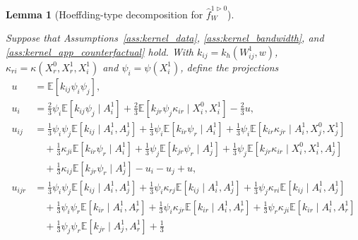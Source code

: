 \documentclass[11pt,lof]{puthesis}
\newcommand{\E}{\ensuremath{\mathbb{E}}}
\theoremstyle{break}
\newtheorem{lemma}{Lemma}[section]
\theoremstyle{proof}
\begin{document}
\begin{lemma}[Hoeffding-type decomposition for
  $\hat f_W^{1 \triangleright 0}$]
  \label{lem:kernel_app_counterfactual_hoeffding}

  Suppose that Assumptions~\ref{ass:kernel_data},
  \ref{ass:kernel_bandwidth}, and
  \ref{ass:kernel_app_counterfactual} hold.
  With $k_{i j} = k_h(W_{i j}^1, w)$,
  $\kappa_{r i} = \kappa(X_r^0, X_r^1, X_i^1)$
  and $\psi_i = \psi(X_i^1)$, define the projections
  \begin{align*}
    u
    &=
    \E\left[
      k_{i j}
      \psi_i
      \psi_j
    \right], \\
    u_i
    &=
    \frac{2}{3} \psi_i
    \E\left[
      k_{i j}
      \psi_j
    \mid A_i^1 \right]
    +
    \frac{2}{3} \E\left[
      k_{jr}
      \psi_j \kappa_{i r}
    \mid X_i^0, X_i^1 \right]
    - \frac{2}{3} u, \\
    u_{i j}
    &=
    \frac{1}{3}
    \psi_i
    \psi_j
    \E\left[
      k_{i j}
    \mid A_i^1, A_j^1 \right]
    +
    \frac{1}{3}
    \psi_i
    \E\left[
      k_{i r} \psi_r
    \mid A_i^1 \right]
    +
    \frac{1}{3}
    \psi_i
    \E\left[
      k_{i r} \kappa_{jr}
    \mid A_i^1, X_j^0, X_j^1 \right] \\
    &\quad+
    \frac{1}{3}
    \kappa_{j i}
    \E\left[
      k_{i r} \psi_r
    \mid A_i^1 \right]
    + \frac{1}{3}
    \psi_j
    \E\left[
      k_{jr} \psi_r
    \mid A_j^1 \right]
    +
    \frac{1}{3}
    \psi_j
    \E\left[
      k_{jr} \kappa_{i r}
    \mid X_i^0, X_i^1, A_j^1 \right] \\
    &\quad+
    \frac{1}{3}
    \kappa_{i j}
    \E\left[
      k_{jr} \psi_r
    \mid A_j^1 \right]
    - u_i - u_j + u, \\
    u_{i j r}
    &=
    \frac{1}{3}
    \psi_i \psi_j
    \E\left[
      k_{i j}
    \mid A_i^1, A_j^1 \right]
    +
    \frac{1}{3}
    \psi_i \kappa_{r j}
    \E\left[
      k_{i j}
    \mid A_i^1, A_j^1 \right]
    +
    \frac{1}{3}
    \psi_j \kappa_{r i}
    \E\left[
      k_{i j}
    \mid A_i^1, A_j^1 \right] \\
    &\quad+
    \frac{1}{3}
    \psi_i \psi_r
    \E\left[
      k_{i r}
    \mid A_i^1, A_r^1 \right]
    + \frac{1}{3}
    \psi_i \kappa_{jr}
    \E\left[
      k_{i r}
    \mid A_i^1, A_r^1 \right]
    +
    \frac{1}{3}
    \psi_r \kappa_{j i}
    \E\left[
      k_{i r}
    \mid A_i^1, A_r^1 \right] \\
    &\quad+
    \frac{1}{3}
    \psi_j \psi_r
    \E\left[
      k_{jr}
    \mid A_j^1, A_r^1 \right]
    + \frac{1}{3}

\end{align*}
\end{lemma}
\end{document}
